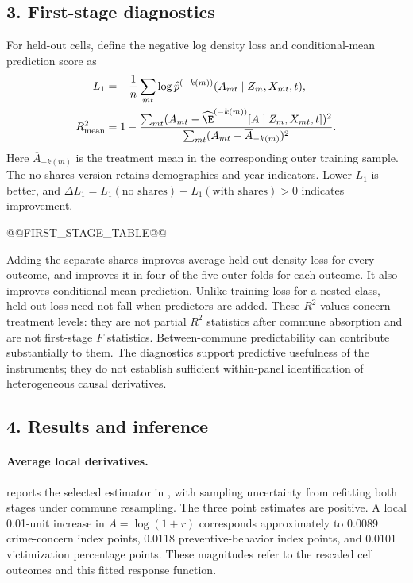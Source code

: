 \subsection*{3. First-stage diagnostics}
For held-out cells, define the negative log density loss and conditional-mean prediction score as
\begin{align}
L_1&=-\frac1n\sum_{mt}\log\widehat p^{(-k(m))}(A_{mt}\mid Z_m,X_{mt},t),\\
R^2_{\mathrm{mean}}&=1-
\frac{\sum_{mt}(A_{mt}-\widehat{\E}^{(-k(m))}[A\mid Z_m,X_{mt},t])^2}
{\sum_{mt}(A_{mt}-\overline A_{-k(m)})^2}.
\end{align}
Here $\overline A_{-k(m)}$ is the treatment mean in the corresponding outer training sample. The no-shares version retains demographics and year indicators. Lower $L_1$ is better, and $\Delta L_1=L_1(\text{no shares})-L_1(\text{with shares})>0$ indicates improvement.

@@FIRST_STAGE_TABLE@@

Adding the separate shares improves average held-out density loss for every outcome, and improves it in four of the five outer folds for each outcome. It also improves conditional-mean prediction. Unlike training loss for a nested class, held-out loss need not fall when predictors are added. These $R^2$ values concern treatment levels: they are not partial $R^2$ statistics after commune absorption and are not first-stage $F$ statistics. Between-commune predictability can contribute substantially to them. The diagnostics support predictive usefulness of the instruments; they do not establish sufficient within-panel identification of heterogeneous causal derivatives.

\subsection*{4. Results and inference}
\paragraph{Average local derivatives.}
 reports the selected estimator in , with sampling uncertainty from refitting both stages under commune resampling. The three point estimates are positive. A local 0.01-unit increase in $A=\log(1+r)$ corresponds approximately to 0.0089 crime-concern index points, 0.0118 preventive-behavior index points, and 0.0101 victimization percentage points. These magnitudes refer to the rescaled cell outcomes and this fitted response function.

